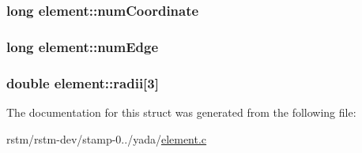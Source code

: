 \hypertarget{structelement_a71de062e2f8663f24aae204c885c742d}{
\subsubsection[{num\-Coordinate}]{\setlength{\rightskip}{0pt plus 5cm}long element\-::num\-Coordinate}}\label{structelement_a71de062e2f8663f24aae204c885c742d}
\hypertarget{structelement_a8ad055608ad3d505d0804e73be8a6743}{
\subsubsection[{num\-Edge}]{\setlength{\rightskip}{0pt plus 5cm}long element\-::num\-Edge}}\label{structelement_a8ad055608ad3d505d0804e73be8a6743}
\hypertarget{structelement_abc3766172dedc7a996146e4902c22b6e}{
\subsubsection[{radii}]{\setlength{\rightskip}{0pt plus 5cm}double element\-::radii\mbox{[}3\mbox{]}}}\label{structelement_abc3766172dedc7a996146e4902c22b6e}


The documentation for this struct was generated from the following file\-:\begin{DoxyCompactItemize}
\item 
rstm/rstm-\/dev/stamp-\/0../yada/\hyperlink{element_8c}{element.\-c}\end{DoxyCompactItemize}
